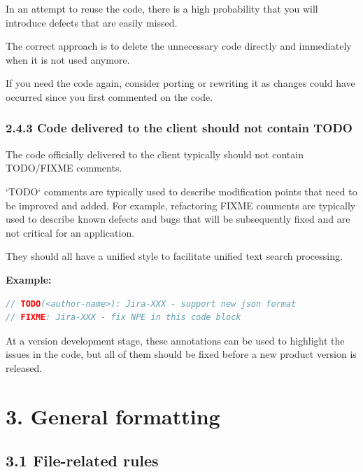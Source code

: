In an attempt to reuse the code, there is a high probability that you will introduce defects that are easily missed.

The correct approach is to delete the unnecessary code directly and immediately when it is not used anymore.

If you need the code again, consider porting or rewriting it as changes could have occurred since you first commented on the code. 



\subsubsection*{\textbf{2.4.3 Code delivered to the client should not contain TODO}}
\leavevmode\newline



The code officially delivered to the client typically should not contain TODO/FIXME comments.

`TODO` comments are typically used to describe modification points that need to be improved and added. For example, refactoring FIXME comments are typically used to describe known defects and bugs that will be subsequently fixed and are not critical for an application.

They should all have a unified style to facilitate unified text search processing.



\textbf{Example:}



\begin{lstlisting}[language=Kotlin]
// TODO(<author-name>): Jira-XXX - support new json format
// FIXME: Jira-XXX - fix NPE in this code block
\end{lstlisting}


At a version development stage, these annotations can be used to highlight the issues in the code, but all of them should be fixed before a new product version is released.

\section*{\textbf{3. General formatting}}

\subsection*{\textbf{3.1 File-related rules}}

